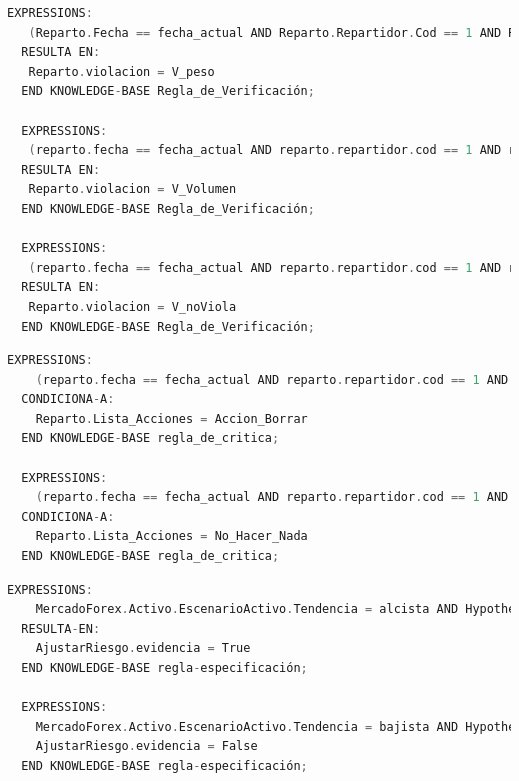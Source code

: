 \begin{lstlisting}[language=C,caption=\textbf{Regla\_de\_Verificación}]
  EXPRESSIONS:
   (Reparto.Fecha == fecha_actual AND Reparto.Repartidor.Cod == 1 AND Reparto.Vehiculo.Cod == 1 AND Reparto.pesototal <= Vehiculo.peso_max AND Parametro.valor == false AND Requisitos_obligatorios == Peso) == true
  RESULTA EN:
   Reparto.violacion = V_peso 
  END KNOWLEDGE-BASE Regla_de_Verificación;
  
  EXPRESSIONS:
   (reparto.fecha == fecha_actual AND reparto.repartidor.cod == 1 AND reparto.vehiculo.cod == 1 AND reparto.volumentotal <= vehiculo.volumen_carga AND parametro.valor == false AND requisitos_obligatorios == Volumen) == true
  RESULTA EN:
   Reparto.violacion = V_Volumen 
  END KNOWLEDGE-BASE Regla_de_Verificación;
  
  EXPRESSIONS:
   (reparto.fecha == fecha_actual AND reparto.repartidor.cod == 1 AND reparto.vehiculo.cod == 1 AND reparto.volumentotal <= vehiculo.volumen_carga AND parametro.valor == false AND requisitos_obligatorios == Volumen) == false
  RESULTA EN:
   Reparto.violacion = V_noViola 
  END KNOWLEDGE-BASE Regla_de_Verificación;
\end{lstlisting}
    
\begin{lstlisting}[language=C,caption=\textbf{Regla\_de\_critica}]
  EXPRESSIONS:
    (reparto.fecha == fecha_actual AND reparto.repartidor.cod == 1 AND reparto.vehiculo.cod == 1 AND (Violación == V_peso OR Violación == V_volumen)) == true 
  CONDICIONA-A:
    Reparto.Lista_Acciones = Accion_Borrar
  END KNOWLEDGE-BASE regla_de_critica;
  
  EXPRESSIONS:
    (reparto.fecha == fecha_actual AND reparto.repartidor.cod == 1 AND reparto.vehiculo.cod == 1 AND (Violación == V_peso OR Violación == V_volumen)) == false 
  CONDICIONA-A:
    Reparto.Lista_Acciones = No_Hacer_Nada
  END KNOWLEDGE-BASE regla_de_critica;
\end{lstlisting}
      
\begin{lstlisting}[language=C,caption=\textbf{Regla de abstraccion}]
  EXPRESSIONS:
    MercadoForex.Activo.EscenarioActivo.Tendencia = alcista AND Hypothesis = AjustarRiesgo
  RESULTA-EN:
    AjustarRiesgo.evidencia = True
  END KNOWLEDGE-BASE regla-especificación;

  EXPRESSIONS:
    MercadoForex.Activo.EscenarioActivo.Tendencia = bajista AND Hypothesis = AjustarRiesgo RESULTA-EN:
    AjustarRiesgo.evidencia = False
  END KNOWLEDGE-BASE regla-especificación;

\end{lstlisting}
\newpage

